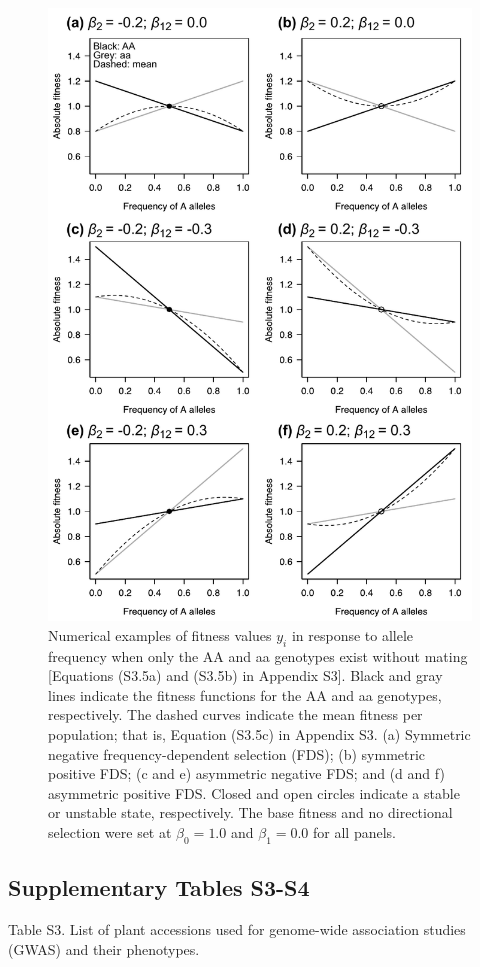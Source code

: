 \documentclass[12pt,]{article}
\begin{document}
\begin{figure}[]
  \includegraphics[width=0.75\linewidth]{AsymFDSinbred.pdf}
  \caption{Numerical examples of fitness values $y_i$ in response to allele frequency when only the AA and aa genotypes exist without mating [Equations (S3.5a) and (S3.5b) in Appendix S3]. Black and gray lines indicate the fitness functions for the AA and aa genotypes, respectively. The dashed curves indicate the mean fitness per population; that is, Equation (S3.5c) in Appendix S3. (a) Symmetric negative frequency-dependent selection (FDS); (b) symmetric positive FDS; (c and e) asymmetric negative FDS; and (d and f) asymmetric positive FDS. Closed and open circles indicate a stable or unstable state, respectively. The base fitness and no directional selection were set at $\beta_0=1.0$ and $\beta_1=0.0$ for all panels.}
  \label{figS3:FDSinbred}
\end{figure}

\newpage
\subsection*{Supplementary Tables S3-S4}

\medskip
\noindent
Table S3. List of plant accessions used for genome-wide association studies (GWAS) and their phenotypes.
\end{document}
